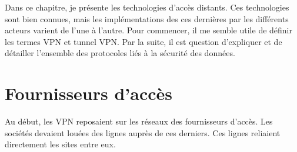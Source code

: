 Dans ce chapitre, je présente les technologies d'accès distants.
Ces technologies sont bien connues, mais les implémentations des ces dernières par les différents acteurs varient de l'une à l'autre.
Pour commencer, il me semble utile de définir les termes VPN et tunnel VPN.
Par la suite, il est question d'expliquer et de détailler l'ensemble des protocoles liés à la sécurité des données.









%

\section{Fournisseurs d'accès}
Au début, les VPN reposaient sur les réseaux des fournisseurs d'accès.
Les sociétés devaient louées des lignes auprès de ces derniers. 
Ces lignes reliaient directement les sites entre eux.



